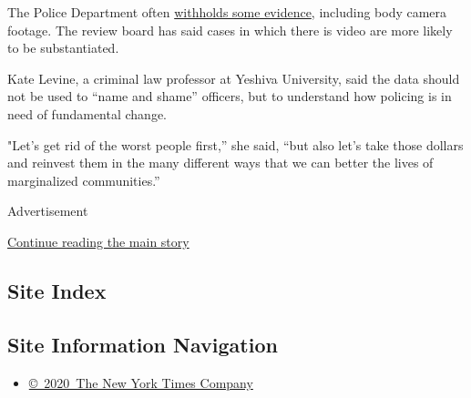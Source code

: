 The Police Department often
\href{https://www.propublica.org/article/the-nypd-is-withholding-evidence-from-investigations-into-police-abuse}{withholds
some evidence}, including body camera footage. The review board has said
cases in which there is video are more likely to be substantiated.

Kate Levine, a criminal law professor at Yeshiva University, said the
data should not be used to ``name and shame'' officers, but to
understand how policing is in need of fundamental change.

"Let's get rid of the worst people first,'' she said, ``but also let's
take those dollars and reinvest them in the many different ways that we
can better the lives of marginalized communities.''

Advertisement

\protect\hyperlink{after-bottom}{Continue reading the main story}

\hypertarget{site-index}{%
\subsection{Site Index}\label{site-index}}

\hypertarget{site-information-navigation}{%
\subsection{Site Information
Navigation}\label{site-information-navigation}}

\begin{itemize}
\tightlist
\item
  \href{https://help.nytimes3xbfgragh.onion/hc/en-us/articles/115014792127-Copyright-notice}{©~2020~The
  New York Times Company}
\end{itemize}

